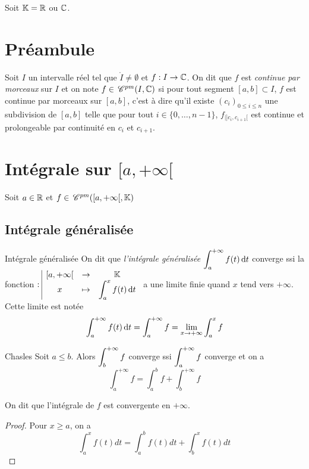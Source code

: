 Soit $\mathbb{K} = \mathbb{R}$ ou $\mathbb{C}$. 

\section*{Préambule}

\begin{definition}{}{}
    Soit $I$ un intervalle réel tel que $\mathring I \neq \emptyset$ et $f : I \to \mathbb{C}$. 
    On dit que $f$ est \textit{continue par morceaux} sur $I$ et on note $f \in \,\mathscr C^{pm}(I, \mathbb{C})$ si pour tout segment 
    $[a, b] \subset I$, $f$ est continue par morceaux sur $[a, b]$, c'est à dire qu'il existe 
    $(c_i)_{0 \leq i \leq n}$ une subdivision de $[a, b]$ telle que pour tout $i \in \{0, \ldots, n-1\}$,
    $f_{|]c_i, c_{i+1}[}$ est continue et prolongeable par continuité en $c_i$ et $c_{i+1}$.
\end{definition}


\section{Intégrale sur \texorpdfstring{$[a, + \infty[$}{x >= a}}

Soit $a \in \mathbb{R}$ et $f \in \,\mathscr C^{pm} ([a, + \infty[, \mathbb{K})$

\subsection{Intégrale généralisée }

\begin{definition}{Intégrale généralisée}{}
    On dit que \textit{l'intégrale généralisée} $\displaystyle \int_a^{+ \infty} f(t) \,\mathrm{d}t$ converge ssi 
    la fonction $: \space \begin{array}{|ccc} \displaystyle [a, + \infty[ & \to & \displaystyle \mathbb{K} \\ \displaystyle x & \mapsto & \displaystyle \int_a^x f(t) \,\mathrm{d}t \end{array}$ a une limite finie quand 
    $x$ tend vers $+ \infty$. Cette limite est notée 
    $$\int_a^{+ \infty} f(t) \,\mathrm{d}t = \int_{a }^{+ \infty   } f = \lim_{x \to + \infty} \int_{a }^{x } f$$
\end{definition}

\begin{proposition}{Chasles}{}
    Soit $a \leqslant b $. Alors $\displaystyle \int_b^{+ \infty} f $ converge ssi 
    $\displaystyle \int_a^{+ \infty} f $ converge et on a 
    $$\int_a^{+ \infty} f = \int_a^b f + \int_b^{+ \infty} f$$

    On dit que l'intégrale de $f$ est convergente en $+\infty$.
\end{proposition}

\begin{proof}
    Pour $x \geqslant a$, on a 
    $$\int_a^x f(t) dt = \int_a^b f(t) dt + \int_b^x f(t) dt$$
\end{proof}

